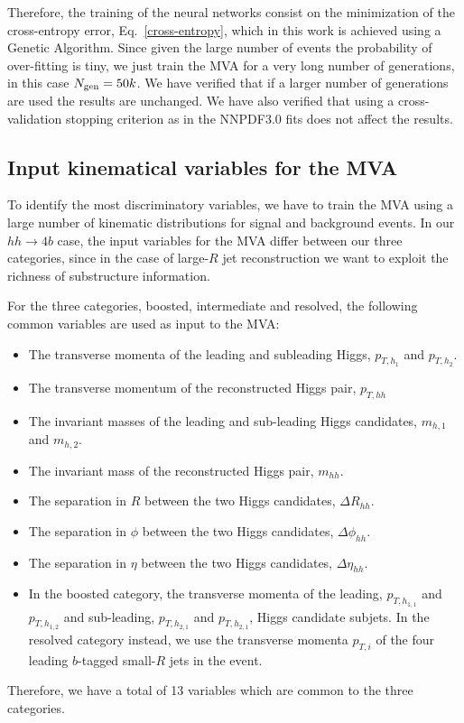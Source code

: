  Therefore, the training of the neural networks consist on the
 minimization of the cross-entropy error,
 Eq.~\ref{cross-entropy}, which in this work is achieved using a
 Genetic Algorithm.
 Since given the large number of events the probability of
 over-fitting is tiny, we just train the MVA for a very long
 number of generations, in this case $N_{\rm gen}=50k$.
 We have verified that if a larger number of generations
 are used the results are unchanged.
 We have also verified that using a cross-validation stopping
 criterion as in the NNPDF3.0 fits does not affect the results.

 

 \subsection{Input kinematical variables for the MVA}

 To identify the most discriminatory variables, we have to train
 the MVA using a large number of kinematic distributions for
 signal and background events.
%
In our $hh\to 4b$ case,
the input variables for the MVA differ between our three categories,
since in the case of large-$R$ jet reconstruction we want to exploit
the richness of substructure information.

For the three categories, boosted, intermediate and resolved,
the following common variables are used as input to the MVA:
\begin{itemize}
\item The transverse momenta of the leading and subleading Higgs, $p_{T,h_1}$ and $p_{T,h_2}$.
\item The transverse momentum of the reconstructed Higgs pair, $p_{T,hh}$
\item The invariant masses of the leading and sub-leading Higgs candidates, $m_{h,1}$ and $m_{h,2}$.
\item The invariant mass of the reconstructed Higgs pair, $m_{hh}$.
\item The separation in $R$ between the two Higgs candidates, $\Delta R_{hh}$.
\item The separation in $\phi$  between the two Higgs candidates, $\Delta \phi_{hh}$.
\item The separation in $\eta$  between the two Higgs candidates, $\Delta \eta_{hh}$.
\item In the boosted category,
  the transverse momenta of the leading, $p_{T,h_{1,1}}$ and $p_{T,h_{1,2}}$ and
  sub-leading, $p_{T,h_{2,1}}$ and $p_{T,h_{2,1}}$, Higgs candidate subjets.
  In the resolved category instead, we use the transverse momenta $p_{T,i}$ of the four leading 
   $b$-tagged small-$R$ jets in the event. 
\end{itemize}
Therefore, we have a total of 13 variables which are common to the three categories.



